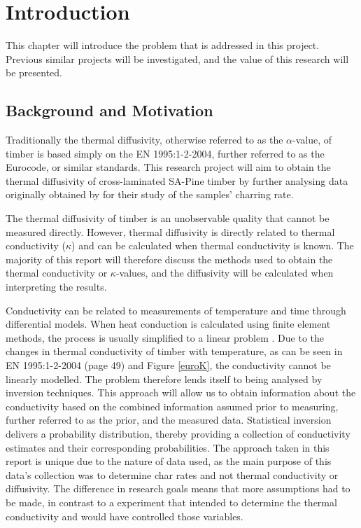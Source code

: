\chapter{Introduction} \label{introduction}
This chapter will introduce the problem that is addressed in this project. 
Previous similar projects will be investigated, and the value of this research will be presented.

\section{Background and Motivation}

Traditionally the thermal diffusivity, otherwise referred to as the $\alpha$-value, of timber is based simply on the EN 1995:1-2-2004\citep{Euro:2004}, further referred to as the Eurocode, or similar standards.
This research project will aim to obtain the thermal diffusivity of cross-laminated SA-Pine timber by further analysing data originally obtained by \citet{Westhuyzen:2020} for their study of the samples' charring rate.

The thermal diffusivity of timber is an unobservable quality that cannot be measured directly.
However, thermal diffusivity is directly related to thermal conductivity ($\kappa$) and can be calculated when thermal conductivity is known.
The majority of this report will therefore discuss the methods used to obtain the thermal conductivity or $\kappa$-values, and the diffusivity will be calculated when interpreting the results.

Conductivity can be related to measurements of temperature and time through differential models. 
When heat conduction is calculated using finite element methods, the process is usually simplified to a linear problem \citep{Fish:2007}. 
Due to the changes in thermal conductivity of timber with temperature, as can be seen in EN 1995:1-2-2004 (page 49) and Figure \ref{euroK}, the conductivity cannot be linearly modelled.
The problem therefore lends itself to being analysed by inversion techniques. 
This approach will allow us to obtain information about the conductivity based on the combined information assumed prior to measuring, further referred to as the prior, and the measured data. 
Statistical inversion delivers a probability distribution, thereby providing a collection of conductivity estimates and their corresponding probabilities.
The approach taken in this report is unique due to the nature of data used, as the main purpose of this data's collection was to determine char rates and not thermal conductivity or diffusivity.
The difference in research goals means that more assumptions had to be made, in contrast to a experiment that intended to determine the thermal conductivity and would have controlled those variables.

